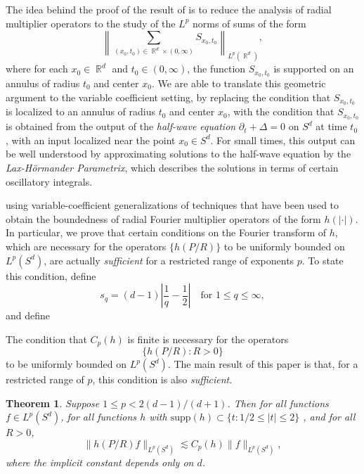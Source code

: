 \documentclass[dvipsnames,letterpaper,12pt]{article}
\DeclareMathOperator{\RR}{\mathbb{R}}
\newtheorem{theorem}{Theorem}
\begin{document}
The idea behind the proof of the result of \cite{HeoandNazarovandSeeger} is to reduce the analysis of radial multiplier operators to the study of the $L^p$ norms of sums of the form
%
\[ \left\| \sum_{(x_0,t_0) \in \RR^d \times (0,\infty)} {S\!}_{x_0,t_0} \right\|_{L^p(\RR^d)}, \]
%
where for each $x_0 \in \RR^d$ and $t_0 \in (0,\infty)$, the function ${S\!}_{x_0,t_0}$ is supported on an annulus of radius $t_0$ and center $x_0$. We are able to translate this geometric argument to the variable coefficient setting, by replacing the condition that ${S\!}_{x_0,t_0}$ is localized to an annulus of radius $t_0$ and center $x_0$, with the condition that ${S\!}_{x_0,t_0}$ is obtained from the output of the \emph{half-wave equation} $\partial_t + \Delta = 0$ on $S^d$ at time $t_0$, with an input localized near the point $x_0 \in S^d$. For small times, this output can be well understood by approximating solutions to the half-wave equation by the \emph{Lax-H\"{o}rmander Parametrix}, which describes the solutions in terms of certain oscillatory integrals.

 using variable-coefficient generalizations of techniques that have been used to obtain the boundedness of radial Fourier multiplier operators of the form $h(|\cdot|)$. In particular, we prove that certain conditions on the Fourier transform of $h$, which are necessary for the operators $\{ h(P/R) \}$ to be uniformly bounded on $L^p(S^d)$, are actually \emph{sufficient} for a restricted range of exponents $p$. To state this condition, define
%
\[ s_q = (d-1) \left| \frac{1}{q} - \frac{1}{2} \right| \quad\text{for $1 \leq q \leq \infty$}, \]
%
and define
%

%
The condition that $C_p(h)$ is finite is necessary for the operators
%
\[ \{ h(P/R) : R > 0 \} \]
%
to be uniformly bounded on $L^p(S^d)$. The main result of this paper is that, for a restricted range of $p$, this condition is also \emph{sufficient}.

\begin{theorem} \label{MainSphereTheorem}
    Suppose $1 \leq p < 2(d-1)/(d+1)$. Then for all functions $f \in L^p(S^d)$, for all functions $h$ with $\text{supp}(h) \subset \{ t : 1/2 \leq |t| \leq 2 \}$ , and for all $R > 0$,
    \[ \| h(P/R) f \|_{L^p(S^d)} \lesssim C_p(h) \| f \|_{L^p(S^d)}, \]
    where the implicit constant depends only on $d$.
\end{theorem}
\end{document}
